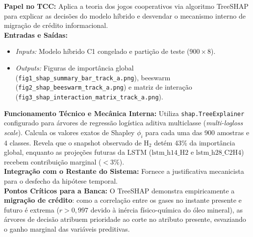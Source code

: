\documentclass[10pt,a4paper]{article}
\begin{document}
\begin{filebox}
\textbf{Papel no TCC:} Aplica a teoria dos jogos cooperativos via algoritmo TreeSHAP para explicar as decisões do modelo híbrido e desvendar o mecanismo interno de migração de crédito informacional.\\
\textbf{Entradas e Saídas:}
\begin{itemize}[leftmargin=*,itemsep=1pt]
  \item \textit{Inputs:} Modelo híbrido C1 congelado e partição de teste ($900 \times 8$).
  \item \textit{Outputs:} Figuras de importância global (\texttt{fig1\_shap\_summary\_bar\_track\_a.png}), beeswarm (\texttt{fig2\_shap\_beeswarm\_track\_a.png}) e matriz de interação (\texttt{fig3\_shap\_interaction\_matrix\_track\_a.png}).
\end{itemize}
\textbf{Funcionamento Técnico e Mecânica Interna:} 
Utiliza \texttt{shap.TreeExplainer} configurado para árvores de regressão logística aditiva multiclasse (\textit{multi-logloss scale}).
Calcula os valores exatos de Shapley $\phi_i$ para cada uma das 900 amostras e 4 classes. Revela que o snapshot observado de $\text{H}_2$ detém 43\% da importância global, enquanto as projeções futuras da LSTM ($\text{lstm\_h14\_H2}$ e $\text{lstm\_h28\_C2H4}$) recebem contribuição marginal ($< 3\%$).\\
\textbf{Integração com o Restante do Sistema:} Fornece a justificativa mecanicista para o desfecho da hipótese temporal.\\
\textbf{Pontos Críticos para a Banca:} O TreeSHAP demonstra empiricamente a \textbf{migração de crédito}: como a correlação entre os gases no instante presente e futuro é extrema ($r > 0,997$ devido à inércia físico-química do óleo mineral), as árvores de decisão atribuem prioridade ao corte no atributo presente, esvaziando o ganho marginal das variáveis preditivas.
\end{filebox}
\end{document}

